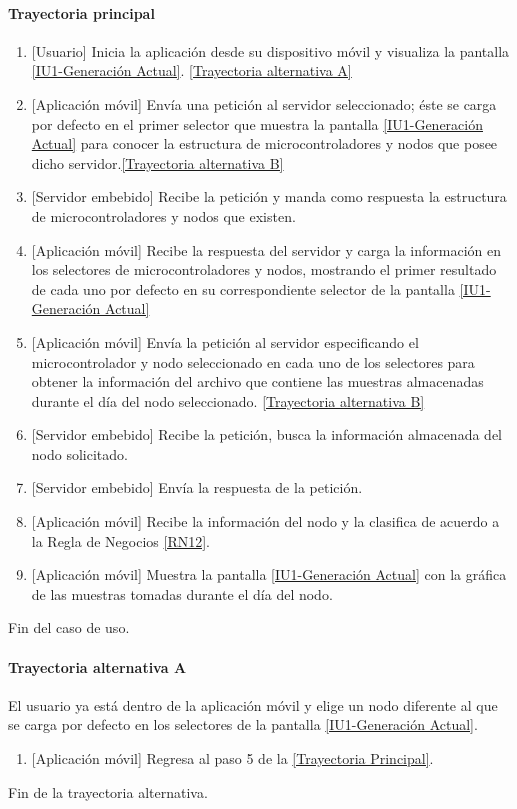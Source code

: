\paragraph{Trayectoria principal}
    \label{SUB-U-CU1.2:TP}
	\begin{enumerate}
	    \item {[Usuario]} Inicia la aplicación desde su dispositivo móvil y visualiza la pantalla \hyperref[fig:monitoreoReal]{[IU1-Generación Actual]}. \hyperref[SUB-U-CU1.1:TA]{[Trayectoria alternativa A]}
	    \item {[Aplicación móvil]} Envía una petición al servidor seleccionado; éste se carga por defecto en el primer selector que muestra la pantalla \hyperref[fig:monitoreoReal]{[IU1-Generación Actual]} para conocer la estructura de microcontroladores y nodos que posee dicho servidor.\hyperref[SUB-U-CU1.1:TB]{[Trayectoria alternativa B]}
	    \item {[Servidor embebido]} Recibe la petición y manda como respuesta la estructura de microcontroladores y nodos que existen.
	    \item {[Aplicación móvil]} Recibe la respuesta del servidor y carga la información en los selectores de microcontroladores y nodos, mostrando el primer resultado de cada uno por defecto en su correspondiente selector de la pantalla \hyperref[fig:monitoreoReal]{[IU1-Generación Actual]} 
	    \item {[Aplicación móvil]} Envía la petición al servidor especificando el microcontrolador y nodo seleccionado en cada uno de los selectores para obtener la información del archivo que contiene las muestras almacenadas durante el día del nodo seleccionado. \hyperref[SUB-U-CU1.1:TB]{[Trayectoria alternativa B]} 
	    \item {[Servidor embebido]} Recibe la petición, busca la información almacenada del nodo solicitado. 
	    \item {[Servidor embebido]} Envía la respuesta de la petición.
	    \item {[Aplicación móvil]} Recibe la información del nodo y la clasifica de acuerdo a la Regla de Negocios \ref{RN12}. 
	    \item {[Aplicación móvil]} Muestra la pantalla \hyperref[fig:monitoreoReal]{[IU1-Generación Actual]} con la gráfica de las muestras tomadas durante el día del nodo.
	\end{enumerate}
	Fin del caso de uso.

\paragraph{Trayectoria alternativa A} \label{SUB-U-CU1.1:TA}
	El usuario ya está dentro de la aplicación móvil y elige un nodo diferente al que se carga por defecto en los selectores de la pantalla \hyperref[fig:monitoreoReal]{[IU1-Generación Actual]}.
	\begin{enumerate}[label=A\arabic*.]
		\item {[Aplicación móvil]} Regresa al paso 5 de la \hyperref[SUB-U-CU1.1:TP]{[Trayectoria Principal]}.
	\end{enumerate}
	Fin de la trayectoria alternativa.

